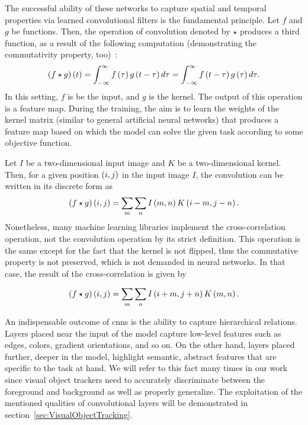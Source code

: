 The successful ability of these networks to capture spatial and temporal properties via learned convolutional filters is the fundamental principle. Let $f$ and $g$ be functions. Then, the operation of convolution denoted by $\star$ produces a third function, as a result of the following computation (demonstrating the commutativity property, too)~\cite{goodfellow2016dl}:
\begin{equation}
    \label{eq:ConvolutionContinuous}
    {\left( {f \star g} \right)} \left( t \right) =
    \int_{-\infty}^{\infty}
    {f} \left( \tau \right)
    {g} \left( t - \tau \right)
    d\tau =
    \int_{-\infty}^{\infty}
    {f} \left( t -\tau \right)
    {g} \left( \tau \right)
    d\tau.
\end{equation}
In this setting, $f$ is be the input, and $g$ is the kernel. The output of this operation is a feature map. During the training, the aim is to learn the weights of the kernel matrix (similar to general artificial neural networks) that produces a feature map based on which the model can solve the given task according to some objective function.

Let $I$ be a two-dimensional input image and $K$ be a two-dimensional kernel. Then, for a given position $\left( {i, j} \right)$ in the input image $I$, the convolution can be written in its discrete form as
\begin{equation}
    \label{eq:ConvolutionDiscrete}
    {\left( {f \star g} \right)} \left( i, j \right) =
    \sum_{m}
    \sum_{n}
    {I} \left( m, n \right)
    {K} \left( i - m, j - n \right).
\end{equation}
Nonetheless, many machine learning libraries implement the cross-correlation operation, not the convolution operation by its strict definition. This operation is the same except for the fact that the kernel is not flipped, thus the commutative property is not preserved, which is not demanded in neural networks. In that case, the result of the cross-correlation is given by~\cite{goodfellow2016dl}

\begin{equation}
    \label{eq:CrossCorrelation}
    {\left( {f \star g} \right)} \left( i, j \right) =
    \sum_{m}
    \sum_{n}
    {I} \left( i + m, j + n \right)
    {K} \left( m, n \right).
\end{equation}

An indispensable outcome of \glspl{cnn} is the ability to capture hierarchical relations. Layers placed near the input of the model capture low-level features such as edges, colors, gradient orientations, and so on. On the other hand, layers placed further, deeper in the model, highlight semantic, abstract features that are specific to the task at hand. We will refer to this fact many times in our work since visual object trackers need to accurately discriminate between the foreground and background as well as properly generalize. The exploitation of the mentioned qualities of convolutional layers will be demonstrated in section~\ref{sec:VisualObjectTracking}.

